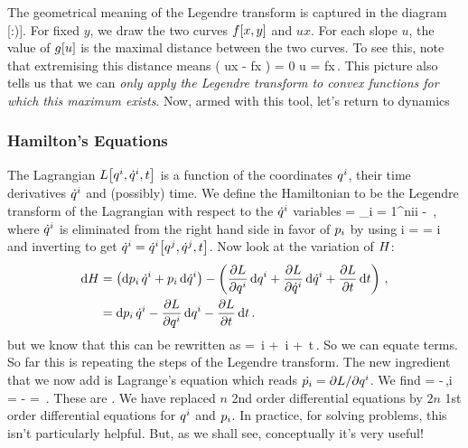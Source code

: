 The geometrical meaning of the Legendre transform is captured in the diagram [:)]. For fixed $y$, we draw the two curves $f\!\left[{x,y}\right]$ and $ux$. For each slope $u$, the value of $g\!\left[{u}\right]$ is the maximal distance between the two curves. To see this, note that extremising this distance means
\beq
{}\left( ux - f\vat x \right) = 0 \implies u = \xpd fx\,.
\eeq
This picture also tells us that we can \emph{only apply the Legendre transform to convex functions for which this maximum exists}. Now, armed with this tool, let's return to dynamics


\subsubsection{Hamilton's Equations}
The Lagrangian $L\!\left[{{q}^{i}, {\dot{q}}^{i}, t}\right]$ is a function of the coordinates ${q}^{i}$, their time derivatives ${\dot{q}}^{i}$ and (possibly) time. We define the Hamiltonian to be the Legendre transform of the Lagrangian with respect to the ${\dot{q}}^{i}$ variables
\beq
\ham{} = \sum_{i = 1}^{n}\gmom i\gvel i - \lag{}\,,
\eeq
where ${\dot{q}}^{i}$ is eliminated from the right hand side in favor of ${p}_{i}$ by using
\beq
\gmom i =  = \gmom i
\eeq
and inverting to get ${\dot{q}}^{i} = {\dot{q}}^{i}\!\left[{{q}^{j}, {\dot{q}}^{j}, t}\right]$. Now look at the variation of $H$:
\begin{align*}
\text{d}H &= \left( \text{d}{p}_{i}\,{\dot{q}}^{i} + {p}_{i}\,\text{d}{\dot{q}}^{i} \right) 
          - \left(\dfrac{\partial{L}}{\partial{{q}^{i}}}\,\text{d}{q}^{i} 
                  + \dfrac{\partial{L}}{\partial{{\dot{q}}^{i}}}\,\text{d}{\dot{q}}^{i}
                  + \dfrac{\partial{L}}{\partial{t}}\,\text{d} t
            \right)\,,\\
        &= \text{d}{p}_{i}\,{\dot{q}}^{i} - \dfrac{\partial{L}}{\partial{{q}^{i}}}\,\text{d}{q}^{i} - \dfrac{\partial{L}}{\partial{t}}\,\text{d} t\,.
\end{align*}
but we know that this can be rewritten as
\beq
\dx\ham = \,\dx\gpos i + \,\dx\gmom i + \,\dx t\,.
\eeq
So we can equate terms. So far this is repeating the steps of the Legendre transform. The new ingredient that we now add is Lagrange's equation which reads $\dot{{p}_{i}} = \partial L/\partial{q}^{i}$. We find
\beq
{} = -\,,\qquad \gvel i = \qquad{}\qquad - = \,.
\eeq
These are . We have replaced $n$ 2nd order differential equations by $2n$ 1st order differential equations for ${q}^{i}$ and ${p}_{i}$. In practice, for solving problems, this isn't particularly helpful. But, as we shall see, conceptually it's very useful!


